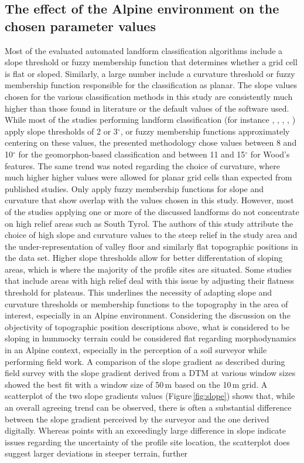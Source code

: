 \documentclass[preprint,12pt,authoryear]{elsarticle}
\begin{document}
\subsection{The effect of the Alpine environment on the chosen parameter values} \label{influence_of_environment}
Most of the evaluated automated landform classification algorithms include a slope threshold or fuzzy membership function that determines whether a grid cell is flat or sloped. Similarly, a large number include a curvature threshold or fuzzy membership function responsible for the classification as planar. The slope values chosen for the various classification methods in this study are consistently much higher than those found in literature or the default values of the software used. While most of the studies performing landform classification (for instance \cite{Barka2011}, \cite{Bocco2001}, \cite{Ehsani2008}, \cite{Jasiewicz2013}, \cite{MacMillan2000a}) apply slope thresholds of 2 or 3$^{\circ}$, or fuzzy membership functions approximately centering on these values, the presented methodology chose values between 8 and 10$^{\circ}$ for the geomorphon-based classification and between 11 and 15$^{\circ}$ for Wood's features. The same trend was noted regarding the choice of curvature, where much higher higher values were allowed for planar grid cells than expected from published studies. Only \cite{Schmidt2004} apply fuzzy membership functions for slope and curvature that show overlap with the values chosen in this study. However, most of the studies applying one or more of the discussed landforms do not concentrate on high relief areas such as South Tyrol. The authors of this study attribute the choice of high slope and curvature values to the steep relief in the study area and the under-representation of valley floor and similarly flat topographic positions in the data set. Higher slope  thresholds allow for better differentation of sloping areas, which is where the majority of the profile sites are situated. Some studies that include areas with high relief \citep{Bocco2001,Herbst2012} deal with this issue by adjusting their flatness threshold for plateaus. This underlines the necessity of adapting slope and curvature thresholds or membership functions to the topography in the area of interest, especially in an Alpine environment. Considering the discussion on the objectivity of topographic position descriptions above, what is considered to be sloping in hummocky terrain could be considered flat regarding morphodynamics in an Alpine context, especially in the perception of a soil surveyor while performing field work. A comparison of the slope gradient as described during field survey with the slope gradient derived from a DTM at various window sizes showed the best fit with a window size of 50\,m based on the 10\,m grid. A scatterplot of the two slope gradients values (Figure\,\ref{fig:slope}) shows that, while an overall agreeing trend can be observed, there is often a substantial difference between the slope gradient perceived by the surveyor and the one derived digitally. Whereas points with an exceedingly large difference in slope indicate issues regarding the uncertainty of the profile site location, the scatterplot does suggest larger deviations in steeper terrain, further 
\end{document}
